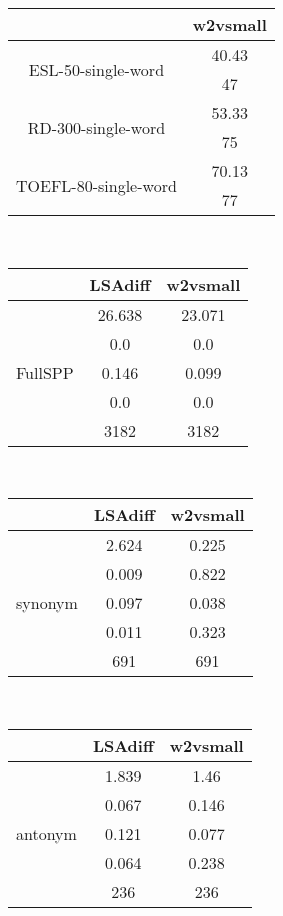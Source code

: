 \documentclass{article}
\begin{document}
\begin{tabular}{cc|}\cline{2-2}
&\multicolumn{1}{|c|}{w2vsmall} \\\hline
\multicolumn{1}{|c|}{\multirow{2}{*}{ESL-50-single-word}} & 40.43 \\
\multicolumn{1}{|c|}{} & 47 \\
\hline
\multicolumn{1}{|c|}{\multirow{2}{*}{RD-300-single-word}} & 53.33 \\
\multicolumn{1}{|c|}{} & 75 \\
\hline
\multicolumn{1}{|c|}{\multirow{2}{*}{TOEFL-80-single-word}} & 70.13 \\
\multicolumn{1}{|c|}{} & 77 \\
\hline
\end{tabular}\\
\begin{tabular}{ccc|}\cline{2-3}
&\multicolumn{1}{|c}{LSAdiff} & w2vsmall \\\hline
\multicolumn{1}{|c|}{\multirow{5}{*}{FullSPP}} & 26.638 & 23.071 \\
\multicolumn{1}{|c|}{} & 0.0 & 0.0 \\
\multicolumn{1}{|c|}{} & 0.146 & 0.099 \\
\multicolumn{1}{|c|}{} & 0.0 & 0.0 \\
\multicolumn{1}{|c|}{} & 3182 & 3182 \\
\hline
\end{tabular}\\
\begin{tabular}{ccc|}\cline{2-3}
&\multicolumn{1}{|c}{LSAdiff} & w2vsmall \\\hline
\multicolumn{1}{|c|}{\multirow{5}{*}{synonym}} & 2.624 & 0.225 \\
\multicolumn{1}{|c|}{} & 0.009 & 0.822 \\
\multicolumn{1}{|c|}{} & 0.097 & 0.038 \\
\multicolumn{1}{|c|}{} & 0.011 & 0.323 \\
\multicolumn{1}{|c|}{} & 691 & 691 \\
\hline
\end{tabular}\\
\begin{tabular}{ccc|}\cline{2-3}
&\multicolumn{1}{|c}{LSAdiff} & w2vsmall \\\hline
\multicolumn{1}{|c|}{\multirow{5}{*}{antonym}} & 1.839 & 1.46 \\
\multicolumn{1}{|c|}{} & 0.067 & 0.146 \\
\multicolumn{1}{|c|}{} & 0.121 & 0.077 \\
\multicolumn{1}{|c|}{} & 0.064 & 0.238 \\
\multicolumn{1}{|c|}{} & 236 & 236 \\
\hline
\end{tabular}\\
\end{document}
